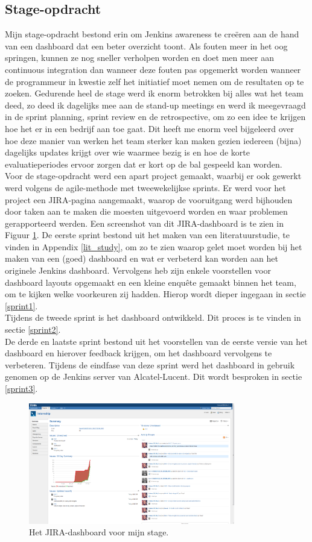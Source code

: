 \documentclass[10pt,a4paper]{article}
\begin{document}
\subsection{Stage-opdracht}
\label{opdracht}
Mijn stage-opdracht bestond erin om Jenkins awareness te cre\"eren aan de hand van een dashboard dat een beter overzicht toont.
Als fouten meer in het oog springen, kunnen ze nog sneller verholpen worden en doet men meer aan continuous integration dan wanneer deze fouten pas opgemerkt worden wanneer de programmeur in kwestie zelf het initiatief moet nemen om de resultaten op te zoeken. Gedurende heel de stage werd ik enorm betrokken bij alles wat het team deed, zo deed ik dagelijks mee aan de stand-up meetings en werd ik meegevraagd in de sprint planning, sprint review en de retrospective, om zo een idee te krijgen hoe het er in een bedrijf aan toe gaat. Dit heeft me enorm veel bijgeleerd over hoe deze manier van werken het team sterker kan maken gezien iedereen (bijna) dagelijks updates krijgt over wie waarmee bezig is en hoe de korte evaluatieperiodes ervoor zorgen dat er kort op de bal gespeeld kan worden.\\
Voor de stage-opdracht werd een apart project gemaakt, waarbij er ook gewerkt werd volgens de agile-methode met tweewekelijkse sprints. Er werd voor het project een JIRA-pagina aangemaakt, waarop de vooruitgang werd bijhouden door taken aan te maken die  moesten uitgevoerd worden en waar problemen gerapporteerd werden. Een screenshot van dit JIRA-dashboard is te zien in Figuur \ref{my_jira}.
De eerste sprint bestond uit het maken van een literatuurstudie, te vinden in Appendix \ref{lit_study}, om zo te zien waarop gelet moet worden bij het maken van een (goed) dashboard en wat er verbeterd kan worden aan het originele Jenkins dashboard. Vervolgens heb zijn enkele voorstellen voor dashboard layouts opgemaakt en een kleine enqu\^ete gemaakt binnen het team, om te kijken welke voorkeuren zij hadden. Hierop wordt dieper ingegaan in sectie \ref{sprint1}.\\
Tijdens de tweede sprint is het dashboard ontwikkeld. Dit proces is te vinden in sectie \ref{sprint2}.\\
De derde en laatste sprint bestond uit het voorstellen van de eerste versie van het dashboard en hierover feedback krijgen, om het dashboard vervolgens te verbeteren. Tijdens de eindfase van deze sprint werd het dashboard in gebruik genomen op de Jenkins server van Alcatel-Lucent. Dit wordt besproken in sectie \ref{sprint3}.

\begin{figure}[ht!]
\centering
\includegraphics[width=90mm]{myJIRAscreenshot.png}
\caption{Het JIRA-dashboard voor mijn stage.} 
\label{my_jira}
\end{figure}
\end{document}
